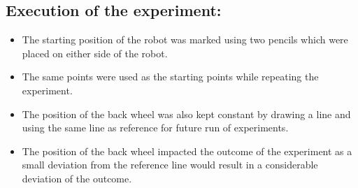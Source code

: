 \documentclass[11pt,a4paper]{article}
\begin{document}
	\subsection{Execution of the experiment:}
	\begin{itemize}
		\item The starting position of the robot was marked using two pencils which were placed on either side of the robot.
		\item The same points were used as the starting points while repeating the experiment.
		\item The position of the back wheel was also kept constant by drawing a line and using the same line as reference for future run of experiments.
		\item The position of the back wheel impacted the outcome of the experiment as a small deviation from the reference line would result in a considerable deviation of the outcome.
		

\end{itemize}
\end{document}
